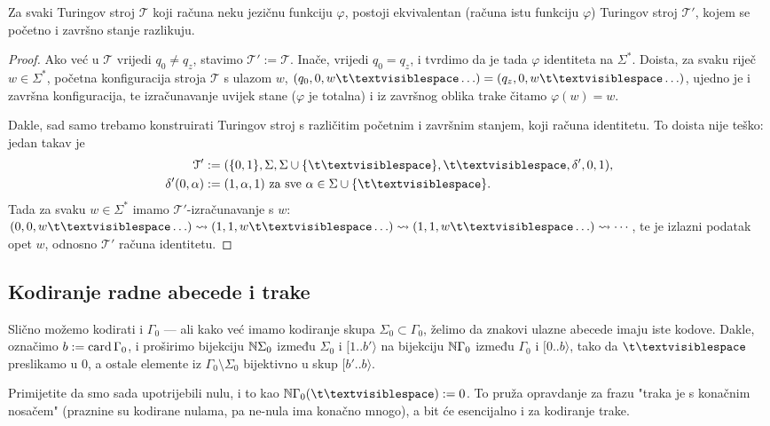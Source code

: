 \begin{lema}
Za svaki Turingov stroj $\mathcal T$ koji računa neku jezičnu funkciju $\varphi$, postoji ekvivalentan (računa istu funkciju $\varphi$) Turingov stroj $\mathcal T'$, kojem se početno i završno stanje razlikuju.
\end{lema}
\begin{proof}
Ako već u $\mathcal T$ vrijedi $q_0\not=q_z$, stavimo $\mathcal T':=\mathcal T$. Inače, vrijedi $q_0=q_z$, i tvrdimo da je tada $\varphi$ identiteta na $\Sigma^*$. Doista, za svaku riječ $w\in\Sigma^*$, početna konfiguracija stroja $\mathcal T$ s ulazom $w$, $(q_0,0,w\bl\ldots)=(q_z,0,w\bl\ldots)$, ujedno je i završna konfiguracija, te izračunavanje uvijek stane ($\varphi$ je totalna) i iz završnog oblika trake čitamo $\varphi(w)=w$.

Dakle, sad samo trebamo konstruirati Turingov stroj s različitim početnim i za\-vrš\-nim stanjem, koji računa identitetu. To doista nije teško: jedan takav je
\begin{align}
    \mathcal T'&:=(\{0,1\},\Sigma,\Sigma\cup\{\bl\},\bl,\delta',0,1)\text,\\
    \delta'(0,\alpha)&:=(1,\alpha,1)\text{ za sve $\alpha\in\Sigma\cup\{\bl\}$.}
\end{align}
Tada za svaku $w\in\Sigma^*$ imamo $\mathcal T'$-izračunavanje s $w$: $(0,0,w\bl\ldots)\leadsto(1,1,w\bl\ldots)\leadsto(1,1,w\bl\ldots)\leadsto\cdots$,
te je izlazni podatak opet $w$, odnosno $\mathcal T'$ računa identitetu.
\end{proof}

\subsection{Kodiranje radne abecede i trake}

Slično možemo kodirati i $\Gamma_0$ --- ali kako već imamo kodiranje skupa $\Sigma_0\subset\Gamma_0$, želimo da znakovi ulazne abecede imaju iste kodove. Dakle, označimo $b:=\operatorname{card}\Gamma_0$, i proširimo bijekciju ${\mathbb N}\Sigma_0$ između $\Sigma_0$ i $[1..b'\rangle$ na bijekciju ${\mathbb N}\Gamma_0$ između $\Gamma_0$ i $[0..b\rangle$, tako da $\bl$ preslikamo u $0$, a ostale elemente iz $\Gamma_0\setminus\Sigma_0$ bijektivno u skup $[b'..b\rangle$.

Primijetite da smo sada upotrijebili nulu, i to kao $\N\Gamma_0(\bl):=0$. To pruža opravdanje za frazu "traka je s konačnim nosačem" (praznine su kodirane nulama, pa ne-nula ima konačno mnogo), a bit će esencijalno i za kodiranje trake.

